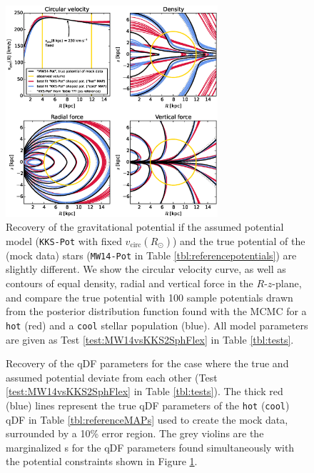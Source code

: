 
\begin{figure}[!htbp]
\centering
\includegraphics[width=0.7\textwidth]{figs/MW14vsKKS2SphFlex_contours_compare.eps}
\caption{Recovery of the gravitational potential if the assumed potential model (\texttt{KKS-Pot} with fixed $v_\text{circ}(R_\odot)$) and the true potential of the (mock data) stars (\texttt{MW14-Pot} in Table \ref{tbl:referencepotentials}) are slightly different. We show the circular velocity curve, as well as contours of equal density, radial and vertical force in the $R$-$z$-plane, and compare the true potential with 100 sample potentials drawn from the posterior distribution function found with the MCMC for a \texttt{hot} (red) and a \texttt{cool} stellar population (blue). All model parameters are given as Test \ref{test:MW14vsKKS2SphFlex} in Table \ref{tbl:tests}. }
\label{fig:MW14vsKKS2SphFlex}
\end{figure}

\begin{figure}[!htb]
\caption{Recovery of the qDF parameters for the case where the true and assumed potential deviate from each other (Test \ref{test:MW14vsKKS2SphFlex} in Table \ref{tbl:tests}). The thick red (blue) lines represent the true qDF parameters of the \texttt{hot} (\texttt{cool}) qDF in Table \ref{tbl:referenceMAPs} used to create the mock data, surrounded by a 10\% error region. The grey violins are the marginalized \pdf{}s for the qDF parameters found simultaneously with the potential constraints shown in Figure \ref{fig:MW14vsKKS2SphFlex}.}
\label{fig:MW14vsKKS2SphFlex_violins}
\end{figure}

